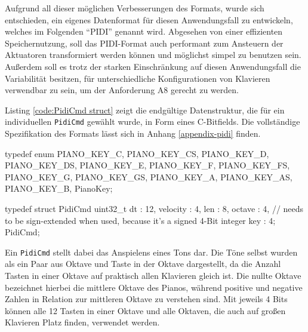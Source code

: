 Aufgrund all dieser möglichen Verbesserungen des Formats, wurde sich entschieden, ein eigenes Datenformat für diesen Anwendungsfall zu entwickeln, welches im Folgenden \enquote{\ac{PIDI}} genannt wird.
Abgesehen von einer effizienten Speichernutzung, soll das \ac{PIDI}-Format auch performant zum Ansteuern der Aktuatoren transformiert werden können und möglichst simpel zu benutzen sein.
Außerdem soll es trotz der starken Einschränkung auf diesen Anwendungsfall die Variabilität besitzen, für unterschiedliche Konfigurationen von Klavieren verwendbar zu sein, um der Anforderung A8 gerecht zu werden.

Listing \ref{code:PidiCmd struct} zeigt die endgültige Datenstruktur, die für ein individuellen \lstinline{PidiCmd} gewählt wurde, in Form eines C-Bitfields.
Die vollständige Spezifikation des Formats lässt sich in Anhang \ref{appendix-pidi} finden.

\begin{UnbrokenCodePage}[style=CStyle, caption={Definition eines PIDI-Kommand}, label={code:PidiCmd struct}]
typedef enum {
    PIANO_KEY_C,
    PIANO_KEY_CS,
    PIANO_KEY_D,
    PIANO_KEY_DS,
    PIANO_KEY_E,
    PIANO_KEY_F,
    PIANO_KEY_FS,
    PIANO_KEY_G,
    PIANO_KEY_GS,
    PIANO_KEY_A,
    PIANO_KEY_AS,
    PIANO_KEY_B,
} PianoKey;

typedef struct PidiCmd {
    uint32_t dt : 12,
    velocity    : 4,
    len         : 8,
    octave      : 4, // needs to be sign-extended when used, because it's a signed 4-Bit integer
    key         : 4;
} PidiCmd;
\end{UnbrokenCodePage}

Ein \lstinline{PidiCmd} stellt dabei das Anspielens eines Tons dar.
Die Töne selbst wurden als ein Paar aus Oktave und Taste in der Oktave dargestellt, da die Anzahl Tasten in einer Oktave auf praktisch allen Klavieren gleich ist.
Die nullte Oktave bezeichnet hierbei die mittlere Oktave des Pianos, während positive und negative Zahlen in Relation zur mittleren Oktave zu verstehen sind.
Mit jeweils 4 Bits können alle 12 Tasten in einer Oktave und alle Oktaven, die auch auf großen Klavieren Platz finden, verwendet werden.

